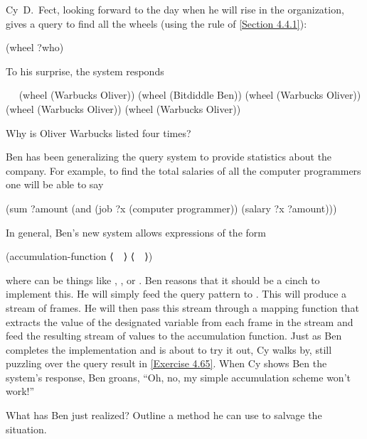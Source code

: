 \begin{exercise}
	\label{Exercise 4.65}
	Cy D. Fect, looking forward to the day when he will rise in the organization, gives a query to find all the wheels (using the  rule of \cref{Section 4.4.1}):
	\begin{scheme}
	  (wheel ?who)
	\end{scheme}
	To his surprise, the system responds
	\begin{scheme}
	  ~~
	  (wheel (Warbucks Oliver))
	  (wheel (Bitdiddle Ben))
	  (wheel (Warbucks Oliver))
	  (wheel (Warbucks Oliver))
	  (wheel (Warbucks Oliver))
	\end{scheme}
	Why is Oliver Warbucks listed four times?
\end{exercise}



\begin{exercise}
	\label{Exercise 4.66}
	Ben has been generalizing the query system to provide statistics about the company.
	For example, to find the total salaries of all the computer programmers one will be able to say
	\begin{scheme}
	  (sum ?amount (and (job ?x (computer programmer))
	                    (salary ?x ?amount)))
	\end{scheme}
	In general, Ben’s new system allows expressions of the form
	\begin{scheme}
	  (accumulation-function ⟨~~⟩ ⟨~~⟩)
	\end{scheme}
	where  can be things like , , or .
	Ben reasons that it should be a cinch to implement this.
	He will simply feed the query pattern to .
	This will produce a stream of frames.
	He will then pass this stream through a mapping function that extracts the value of the designated variable from each frame in the stream and feed the resulting stream of values to the accumulation function.
	Just as Ben completes the implementation and is about to try it out, Cy walks by, still puzzling over the  query result in \cref{Exercise 4.65}.
	When Cy shows Ben the system’s response, Ben groans, “Oh, no, my simple accumulation scheme won’t work!”

	What has Ben just realized?
	Outline a method he can use to salvage the situation.
\end{exercise}



